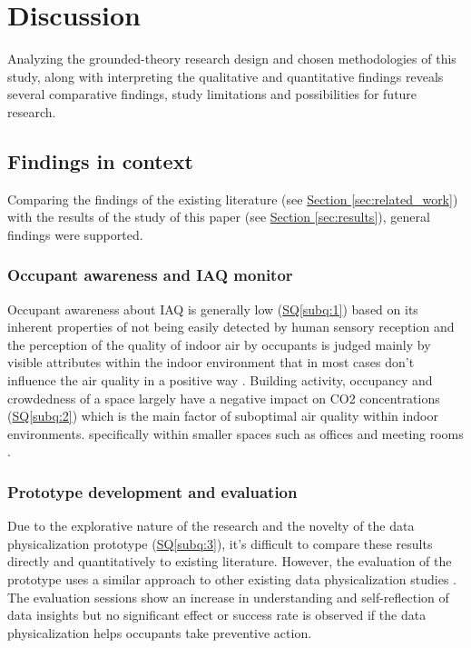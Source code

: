 \section{Discussion}
\label{sec:discussion}

Analyzing the grounded-theory research design and chosen methodologies of this study, along with interpreting the qualitative and quantitative findings reveals several comparative findings, study limitations and possibilities for future research.


\subsection{Findings in context}
Comparing the findings of the existing literature (see \hyperref[sec:related_work]{Section \ref*{sec:related_work}}) with the results of the study of this paper (see \hyperref[sec:results]{Section \ref*{sec:results}}), general findings were supported. 

\subsubsection{Occupant awareness and IAQ monitor}
Occupant awareness about IAQ is generally low (\hyperref[subq:1]{SQ\ref*{subq:1}}) based on its inherent properties of not being easily detected by human sensory reception and the perception of the quality of indoor air by occupants is judged mainly by visible attributes within the indoor environment that in most cases don't influence the air quality in a positive way \cite{schweizer_indoor_2007} \cite{corlan_importance_2021}. Building activity, occupancy and crowdedness of a space largely have a negative impact on CO2 concentrations (\hyperref[subq:2]{SQ\ref*{subq:2}}) which is the main factor of suboptimal air quality within indoor environments. \cite{fromme_indoor_2023} \cite{du_indoor_2020} specifically within smaller spaces such as offices and meeting rooms \cite{zhong_complexity_2021}. 

\subsubsection{Prototype development and evaluation}
Due to the explorative nature of the research and the novelty of the data physicalization prototype (\hyperref[subq:3]{SQ\ref*{subq:3}}), it's difficult to compare these results directly and quantitatively to existing literature. However, the evaluation of the prototype uses a similar approach to other existing data physicalization studies \cite{alexander_data_2019, jansen_opportunities_2015}. The evaluation sessions show an increase in understanding and self-reflection of data insights but no significant effect or success rate is observed if the data physicalization helps occupants take preventive action. 

